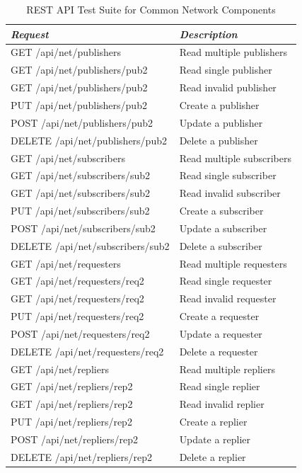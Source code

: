       \begin{table}[H]
        \centering
        \begin{tabular}{p{3in} p{3in}}
          \toprule
          \emph{Request} & \emph{Description} \\ [0.5ex]
          \midrule
             GET /api/net/publishers       & Read multiple publishers \\
             GET /api/net/publishers/pub2  &   Read single publisher \\
             GET /api/net/publishers/pub2  &  Read invalid publisher \\
             PUT /api/net/publishers/pub2  &      Create a publisher \\
            POST /api/net/publishers/pub2  &      Update a publisher \\
          DELETE /api/net/publishers/pub2  &      Delete a publisher \\
             GET /api/net/subscribers      & Read multiple subscribers \\
             GET /api/net/subscribers/sub2 &   Read single subscriber \\
             GET /api/net/subscribers/sub2 &  Read invalid subscriber \\
             PUT /api/net/subscribers/sub2 &      Create a subscriber \\
            POST /api/net/subscribers/sub2 &      Update a subscriber \\
          DELETE /api/net/subscribers/sub2 &      Delete a subscriber \\
             GET /api/net/requesters       & Read multiple requesters \\
             GET /api/net/requesters/req2  &   Read single requester \\
             GET /api/net/requesters/req2  &  Read invalid requester \\
             PUT /api/net/requesters/req2  &      Create a requester \\
            POST /api/net/requesters/req2  &      Update a requester \\
          DELETE /api/net/requesters/req2  &      Delete a requester \\
             GET /api/net/repliers         & Read multiple repliers \\
             GET /api/net/repliers/rep2    &   Read single replier \\
             GET /api/net/repliers/rep2    &  Read invalid replier \\
             PUT /api/net/repliers/rep2    &      Create a replier \\
            POST /api/net/repliers/rep2    &      Update a replier \\
          DELETE /api/net/repliers/rep2    &      Delete a replier \\
          \bottomrule
        \end{tabular}
        \caption{REST API Test Suite for Common Network Components}\label{tab:test-rest-net-suite}
      \end{table}

